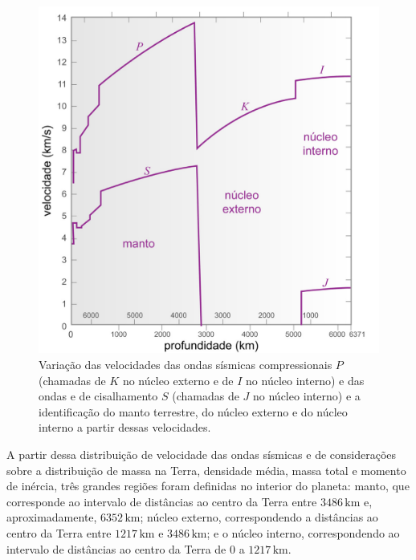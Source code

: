 \documentclass[]{book}
\theoremstyle{definition}
\theoremstyle{definition}
\theoremstyle{definition}
\theoremstyle{remark}
\begin{document}
\begin{figure}

{\centering \includegraphics[width=0.5\linewidth]{fig/figU19} 

}

\caption{Variação das velocidades das ondas sísmicas compressionais $P$ (chamadas de $K$ no núcleo externo e de $I$ no núcleo interno) e das ondas e de cisalhamento $S$ (chamadas de $J$ no núcleo interno) e a identificação do manto terrestre, do núcleo externo e do núcleo interno a partir dessas velocidades.}\label{fig:usp0419}
\end{figure}

A partir dessa distribuição de velocidade das ondas sísmicas e de considerações sobre a distribuição de massa na Terra, densidade média, massa total e momento de inércia, três grandes regiões foram definidas no interior do planeta: manto, que corresponde ao intervalo de distâncias ao centro da Terra entre \(3486\,\mathrm{km}\) e, aproximadamente, \(6352\,\mathrm{km}\); núcleo externo, correspondendo a distâncias ao centro da Terra entre \(1217\,\mathrm{km}\) e \(3486\,\mathrm{km}\); e o núcleo interno, correspondendo ao intervalo de distâncias ao centro da Terra de \(0\) a \(1217\,\mathrm{km}\).
\end{document}
